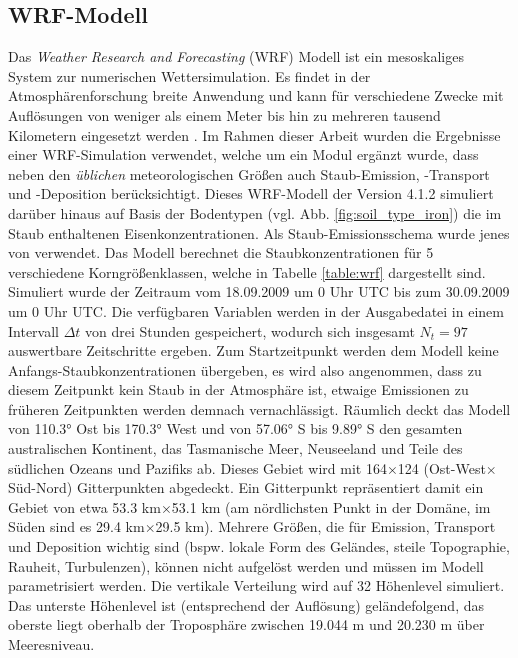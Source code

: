 \documentclass[12pt,a4paper,onecolumn,headheight=30pt]{scrartcl}
\begin{document}
\subsection{WRF-Modell} \label{sec:wrf}
Das \textit{Weather Research and Forecasting} (WRF) Modell ist ein mesoskaliges System zur numerischen Wettersimulation. Es findet in der Atmosphärenforschung breite Anwendung und kann für verschiedene Zwecke mit Auflösungen von weniger als einem Meter bis hin zu mehreren tausend Kilometern eingesetzt werden \citep{NCAR.2021}. Im Rahmen dieser Arbeit wurden die Ergebnisse einer WRF-Simulation verwendet, welche um ein Modul ergänzt wurde, dass neben den \textit{üblichen} meteorologischen Größen auch Staub-Emission, -Transport und -Deposition berücksichtigt. Dieses WRF-Modell der Version 4.1.2 simuliert darüber hinaus auf Basis der Bodentypen (vgl. Abb. \ref{fig:soil_type_iron}) die im Staub enthaltenen Eisenkonzentrationen. Als Staub-Emissionsschema wurde jenes von \citet{Shao.2004} verwendet. Das Modell berechnet die Staubkonzentrationen für 5 verschiedene Korngrößenklassen, welche in Tabelle \ref{table:wrf} dargestellt sind. Simuliert wurde der Zeitraum vom 18.09.2009 um 0 Uhr UTC bis zum 30.09.2009 um 0 Uhr UTC. Die verfügbaren Variablen werden in der Ausgabedatei in einem Intervall $\Delta t$ von drei Stunden gespeichert, wodurch sich insgesamt $N_t = 97$ auswertbare Zeitschritte ergeben. Zum Startzeitpunkt werden dem Modell keine Anfangs-Staubkonzentrationen übergeben, es wird also angenommen, dass zu diesem Zeitpunkt kein Staub in der Atmosphäre ist, etwaige Emissionen zu früheren Zeitpunkten werden demnach vernachlässigt. Räumlich deckt das Modell von 110.3° Ost bis 170.3° West und von 57.06° S bis 9.89° S den gesamten australischen Kontinent, das Tasmanische Meer, Neuseeland und Teile des südlichen Ozeans und Pazifiks ab. Dieses Gebiet wird mit 164$\times$124 (Ost-West$\times$Süd-Nord) Gitterpunkten abgedeckt. Ein Gitterpunkt repräsentiert damit ein Gebiet von etwa 53.3 km$\times$53.1 km (am nördlichsten Punkt in der Domäne, im Süden sind es 29.4 km$\times$29.5 km). Mehrere Größen, die für Emission, Transport und Deposition wichtig sind (bspw. lokale Form des Geländes, steile Topographie, Rauheit, Turbulenzen), können nicht aufgelöst werden und müssen im Modell parametrisiert werden. Die vertikale Verteilung wird auf 32 Höhenlevel simuliert. Das unterste Höhenlevel ist (entsprechend der Auflösung) geländefolgend, das oberste liegt oberhalb der Troposphäre zwischen 19.044 m und 20.230 m über Meeresniveau.
\end{document}
